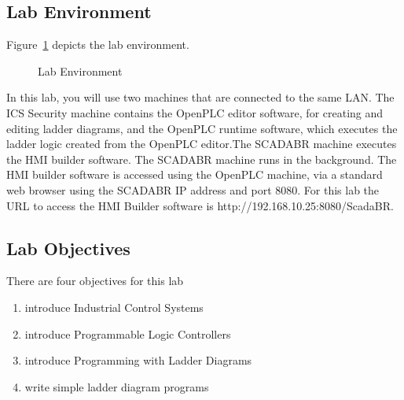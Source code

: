 \subsection{Lab Environment} 
Figure~\ref{fig:labsetup} depicts the lab environment. 

\begin{figure}[!htb]
\begin{center}
\end{center}
\caption{Lab Environment}
\label{fig:labsetup}
\end{figure}

In this lab, you will use two machines that are connected to the same LAN. The ICS Security machine contains the OpenPLC editor software, for creating and editing ladder diagrams, and the OpenPLC runtime software, which executes the ladder logic created from the OpenPLC editor.The SCADABR machine executes the HMI builder software. The SCADABR machine runs in the background.  The HMI builder software is accessed using the OpenPLC machine, via a standard web browser using the SCADABR IP address and port 8080. For this lab the URL to access the HMI Builder software is http://192.168.10.25:8080/ScadaBR.  


\subsection{Lab Objectives}
There are four objectives for this lab 
\begin{enumerate} [noitemsep]
\item introduce Industrial Control Systems
\item introduce Programmable Logic Controllers
\item introduce Programming with Ladder Diagrams
\item write simple ladder diagram programs
\end{enumerate}